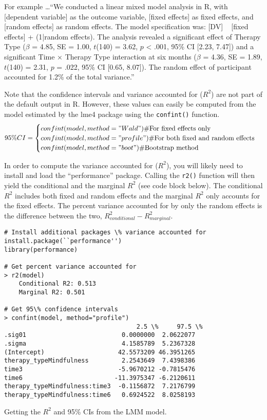For example \dots ``We conducted a linear mixed model analysis in R, with [dependent variable] as the outcome variable, [fixed effects] as fixed effects, and [random effects] as random effects. The model specification was: [DV] ~ [fixed effects] + (1|random effects). The analysis revealed a significant effect of Therapy Type ($\beta$ = 4.85, SE = 1.00, $t$(140) = 3.62, $p$ < .001, 95\% CI [2.23, 7.47]) and a significant Time × Therapy Type interaction at six months ($\beta$ = 4.36, SE = 1.89, $t$(140) = 2.31, $p$ = .022, 95\% CI [0.65, 8.07]). The random effect of participant accounted for 1.2\% of the total variance.''

Note that the confidence intervals and variance accounted for ($R^2$) are not part of the default output in R.  However, these values can easily be computed from the model estimated by the lme4 package using the \texttt{confint()} function.
\[95\%CI=\begin{cases}confint(model, method="Wald")  \# \text{For fixed effects only} \\
confint(model, method="profile") \# \text{For both fixed and random effects}\\
confint(model, method="boot") \# \text{Bootstrap method}\end{cases}
\]

In order to compute the variance accounted for ($R^2$), you will likely need to install and load the ``performance'' package.  Calling the \texttt{r2()} function will then yield the conditional and the marginal $R^2$ (see code block below).  The conditional $R^2$ includes both fixed and random effects and the marginal $R^2$ only accounts for the fixed effects.  The percent variance accounted for by only the random effects is the difference between the two, $R_{conditional}^2 - R_{marginal}^2$.
\begin{tcolorbox}[every float=\centering, drop shadow,     title=R Code]
\begin{verbatim}
# Install additional packages \% variance accounted for
install.package(``performance'')
library(performance)

# Get percent variance accounted for
> r2(model)
	Conditional R2: 0.513
	Marginal R2: 0.501

# Get 95\% confidence intervals
> confint(model, method="profile")
                                    2.5 \%     97.5 \%
.sig01                          0.0000000  2.0622077
.sigma                          4.1585789  5.2367328
(Intercept)                    42.5573209 46.3951265
therapy_typeMindfulness         2.2543649  7.4398386
time3                          -5.9670212 -0.7815476
time6                         -11.3975347 -6.2120611
therapy_typeMindfulness:time3  -0.1156872  7.2176799
therapy_typeMindfulness:time6   0.6924522  8.0258193
 \end{verbatim}
\tcblower
\begin{codeblock}{Getting the $R^2$ and 95\% CIs from the LMM model.}\label{code:LMMci}\end{codeblock}
\end{tcolorbox}

